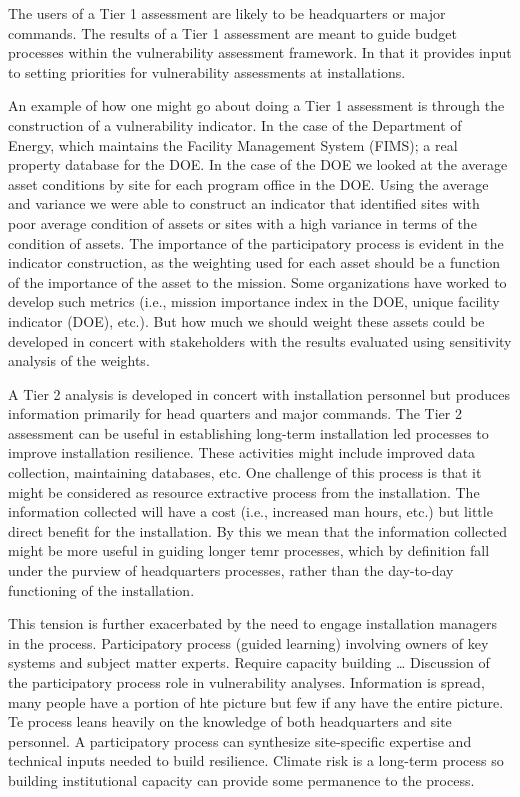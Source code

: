 \documentclass[10pt]{amsart}
\begin{document}
The users of a Tier 1 assessment are likely to be headquarters or major commands.
The results of a Tier 1 assessment are meant to guide budget processes within the vulnerability assessment framework.
In that it provides input to setting priorities for vulnerability assessments at installations.

An example of how one might go about doing a Tier 1 assessment is through the construction of a vulnerability indicator.
In the case of the Department of Energy, which maintains the Facility Management System (FIMS); a real property database for the DOE.
In the case of the DOE we looked at the average asset conditions by site for each program office in the DOE. 
Using the average and variance we were able to construct an indicator that identified sites with poor average condition of assets or sites with a high variance in terms of the condition of assets.
The importance of the participatory process is evident in the indicator construction, as the weighting used for each asset should be a function of the importance of the asset to the mission.
Some organizations have worked to develop such metrics (i.e., mission importance index in the DOE, unique facility indicator (DOE), etc.).
But how much we should weight these assets could be developed in concert with stakeholders with the results evaluated using sensitivity analysis of the weights.

A Tier 2 analysis is developed in concert with installation personnel but produces information primarily for head quarters and major commands.
The Tier 2 assessment can be useful in establishing long-term installation led processes to improve installation resilience.
These activities might include improved data collection, maintaining databases, etc.
One challenge of this process is that it might be considered as resource extractive process from the installation.
The information collected will have a cost (i.e., increased man hours, etc.) but little direct benefit for the installation.
By this we mean that the information collected might be more useful in guiding longer temr processes, which by definition fall under the purview of headquarters processes, rather than the day-to-day functioning of the installation. 

This tension is further exacerbated by the need to engage installation managers in the process.
Participatory process (guided learning) involving owners of key systems and subject matter experts.
Require capacity building \ldots
Discussion of the participatory process role in vulnerability analyses.
Information is spread, many people have a portion of hte picture but few if any have the entire picture.
Te process leans heavily on the knowledge of both headquarters and site personnel. 
A participatory process can synthesize site-specific expertise and technical inputs needed to build resilience. 
Climate risk is a long-term process so building institutional capacity can provide some permanence to the process.
\end{document}

